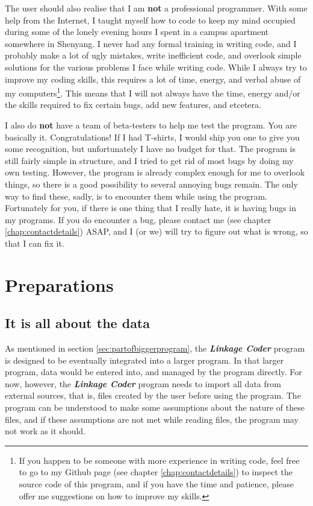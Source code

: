 \documentclass{memoir}
\begin{document}
The user should also realise that I am \textbf{not} a professional programmer. With some help from the Internet, I taught myself how to code to keep my mind occupied during some of the lonely evening hours I spent in a campus apartment somewhere in Shenyang. I never had any formal training in writing code, and I probably make a lot of ugly mistakes, write inefficient code, and overlook simple solutions for the various problems I face while writing code. While I always try to improve my coding skills, this requires a lot of time, energy, and verbal abuse of my computers\footnote{If you happen to be someone with more experience in writing code, feel free to go to my Github page (see chapter \ref{chap:contactdetails}) to inspect the source code of this program, and if you have the time and patience, please offer me suggestions on how to improve my skills.}. This means that I will not always have the time, energy and/or the skills required to fix certain bugs, add new features, and etcetera.

I also do \textbf{not} have a team of beta-testers to help me test the program. You are basically it. Congratulations! If I had T-shirts, I would ship you one to give you some recognition, but unfortunately I have no budget for that. The program is still fairly simple in structure, and I tried to get rid of most bugs by doing my own testing. However, the program is already complex enough for me to overlook things, so there is a good possibility to several annoying bugs remain. The only way to find these, sadly, is to encounter them while using the program. Fortunately for you, if there is one thing that I really hate, it is having bugs in my programs. If you do encounter a bug, please contact me (see chapter \ref{chap:contactdetails}) ASAP, and I (or we) will try to figure out what is wrong, so that I can fix it.

\chapter{Preparations}
\label{chap:preparations}

\section{It is all about the data}
\label{sec:allaboutdata}


As mentioned in section \ref{sec:partofbiggerprogram}, the \textbf{\emph{Linkage Coder}} program is designed to be eventually integrated into a larger program. In that larger program, data would be entered into, and managed by the program directly. For now, however, the \textbf{\emph{Linkage Coder}} program needs to import all data from external sources, that is, files created by the user before using the program. The program can be understood to make some assumptions about the nature of these files, and if these assumptions are not met while reading files, the program may not work as it should.
\end{document}
